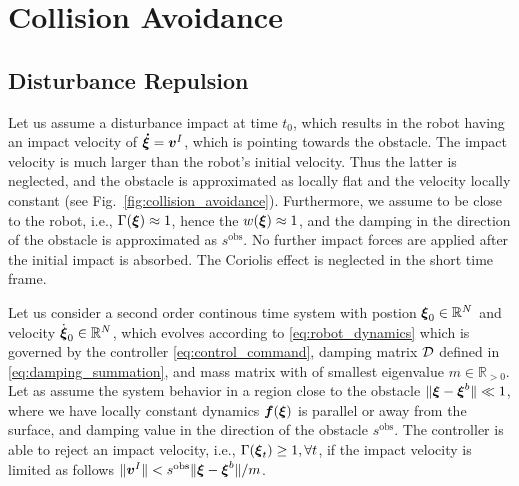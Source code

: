\section{Collision Avoidance} \label{sec:collision_avoidance}



\subsection{Disturbance Repulsion}
Let us assume a disturbance impact at time $t_0$, which results in the robot having an impact velocity of $\boldsymbol{\dot \xi} = \boldsymbol{v}^I$, which is pointing towards the obstacle. The impact velocity is much larger than the robot's initial velocity. Thus the latter is neglected, and the obstacle is approximated as locally flat and the velocity locally constant (see Fig.~\ref{fig:collision_avoidance}). Furthermore, we assume to be close to the robot, i.e., $\Gamma(\boldsymbol{\xi}) \approx 1$, hence the $w(\boldsymbol{\xi}) \approx 1$, and the damping in the direction of the obstacle is approximated as $s^{\mathrm{obs}}$.
No further impact forces are applied after the initial impact is absorbed. The Coriolis effect is neglected in the short time frame.

\begin{lemma}
	Let us consider a second order continous time system with postion $\boldsymbol{\xi}_0 \in \mathbb{R}^N$ and velocity $\dot{\boldsymbol{\xi}}_0 \in \mathbb{R}^N$, which evolves according to \eqref{eq:robot_dynamics} which is governed by the controller \eqref{eq:control_command}, damping matrix $\mathcal{D}$ defined in \eqref{eq:damping_summation}, and mass matrix with of smallest eigenvalue $m \in \mathbb{R}_{>0}$.
	Let as assume the system behavior in a region close to the obstacle $\| \boldsymbol{\xi} - \boldsymbol{\xi}^b \| \ll 1$, where we have locally constant dynamics $\boldsymbol{f}(\boldsymbol{\xi})$ is parallel or away from the surface, and damping value in the direction of the obstacle $s^{\mathrm{obs}}$.
	The controller is able to reject an impact velocity, i.e., $\Gamma(\boldsymbol{\xi}_t) \geq 1, \forall t$, if the impact velocity is limited as follows $\| \boldsymbol{v}^I \| < s^{\mathrm{obs}} \| \boldsymbol{\xi} - \boldsymbol{\xi}^b \| / m$.
\end{lemma}

